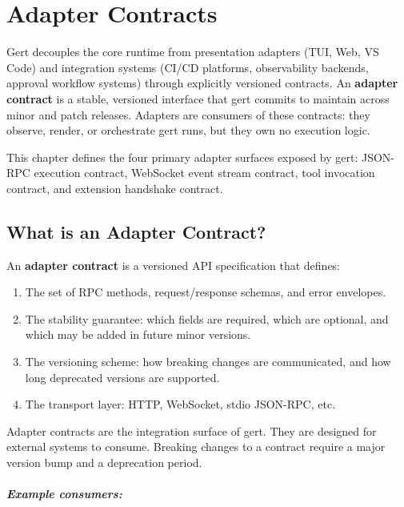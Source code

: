 \chapter{Adapter Contracts}

Gert decouples the core runtime from presentation adapters (TUI, Web, VS
Code) and integration systems (CI/CD platforms, observability backends, approval
workflow systems) through explicitly versioned contracts.  An \textbf{adapter
contract} is a stable, versioned interface that gert commits to maintain across
minor and patch releases.  Adapters are consumers of these contracts: they
observe, render, or orchestrate gert runs, but they own no execution logic.

This chapter defines the four primary adapter surfaces exposed by gert:
JSON-RPC execution contract, WebSocket event stream contract, tool invocation
contract, and extension handshake contract.

\section{What is an Adapter Contract?}
\label{sec:adapter-contract-definition}

An \textbf{adapter contract} is a versioned API specification that defines:

\begin{enumerate}
  \item The set of RPC methods, request/response schemas, and error envelopes.
  \item The stability guarantee: which fields are required, which are optional,
        and which may be added in future minor versions.
  \item The versioning scheme: how breaking changes are communicated, and how
        long deprecated versions are supported.
  \item The transport layer: HTTP, WebSocket, stdio JSON-RPC, etc.
\end{enumerate}

Adapter contracts are the integration surface of gert.  They are designed for
external systems to consume.  Breaking changes to a contract require a major
version bump and a deprecation period.

\paragraph{Example consumers:}

